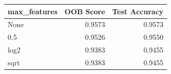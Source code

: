 \begin{tabular}{lrr}
\toprule
max\_features & OOB Score & Test Accuracy \\
\midrule
None & 0.9573 & 0.9573 \\
0.5 & 0.9526 & 0.9550 \\
log2 & 0.9383 & 0.9455 \\
sqrt & 0.9383 & 0.9455 \\
\bottomrule
\end{tabular}
